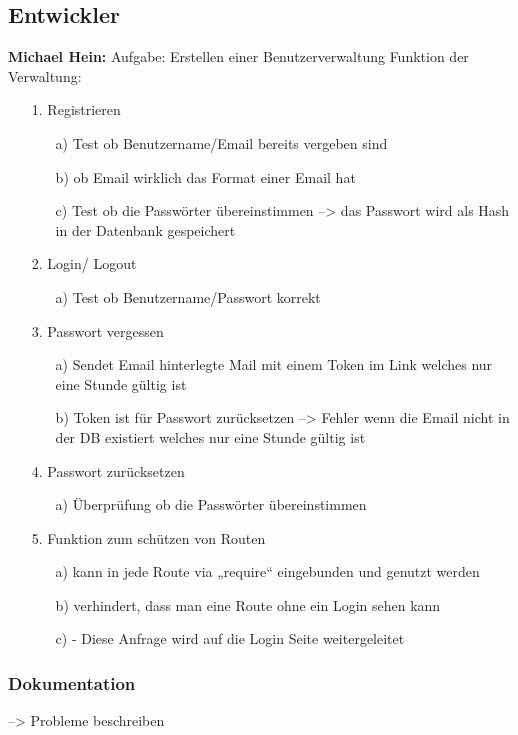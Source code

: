 \documentclass[12pt,a4paper]{article}
\begin{document}
\subsection{Entwickler}
\textbf{Michael Hein:}
\newline
Aufgabe: Erstellen einer Benutzerverwaltung
\newline
Funktion der Verwaltung:
\begin{itemize}
\item[1.]Registrieren
\begin{itemize}
        \item[a)]Test ob Benutzername/Email bereits vergeben sind
        \item[b)] ob Email wirklich das Format einer Email hat
        \item[c)]Test ob die Passwörter übereinstimmen --> das Passwort wird als Hash in der  Datenbank gespeichert
\end{itemize}
\item[2.]Login/ Logout
\begin{itemize}
\item[a)]Test ob Benutzername/Passwort korrekt
\end{itemize}
\item[3.]Passwort vergessen 
\begin{itemize}
 \item[a)] Sendet Email hinterlegte Mail mit einem Token im Link welches nur eine Stunde gültig ist
\item[b)]Token ist für Passwort zurücksetzen --> Fehler wenn die Email nicht in der DB existiert welches nur eine Stunde gültig ist
\end{itemize}
\item[4.]Passwort zurücksetzen
\begin{itemize}
\item[a)]Überprüfung ob die Passwörter übereinstimmen
\end{itemize}
\item[5.]Funktion zum schützen von Routen
\begin{itemize}
\item[a)]kann in jede Route via „require“ eingebunden und genutzt werden
\item[b)]verhindert, dass man eine Route ohne ein Login sehen kann
 \item[c)]- Diese Anfrage wird auf die Login Seite weitergeleitet
\end{itemize}
\end{itemize}
\subsubsection*{Dokumentation} --> Probleme beschreiben
\newpage
\end{document}
